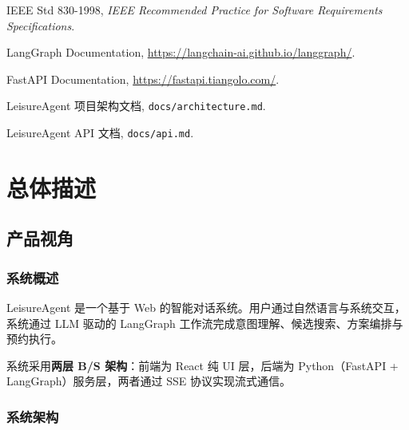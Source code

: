 \documentclass[12pt,a4paper]{ctexart}
\begin{document}
\begin{enumerate}[label={[}\arabic*{]}]
  \item IEEE Std 830-1998, \textit{IEEE Recommended Practice for Software Requirements Specifications}.
  \item LangGraph Documentation, \url{https://langchain-ai.github.io/langgraph/}.
  \item FastAPI Documentation, \url{https://fastapi.tiangolo.com/}.
  \item LeisureAgent 项目架构文档, \texttt{docs/architecture.md}.
  \item LeisureAgent API 文档, \texttt{docs/api.md}.
\end{enumerate}

\newpage

\section{总体描述}

\subsection{产品视角}

\subsubsection{系统概述}

LeisureAgent 是一个基于 Web 的智能对话系统。用户通过自然语言与系统交互，系统通过 LLM 驱动的 LangGraph 工作流完成意图理解、候选搜索、方案编排与预约执行。

系统采用\textbf{两层 B/S 架构}：前端为 React 纯 UI 层，后端为 Python（FastAPI + LangGraph）服务层，两者通过 SSE 协议实现流式通信。

\subsubsection{系统架构}
\end{document}
